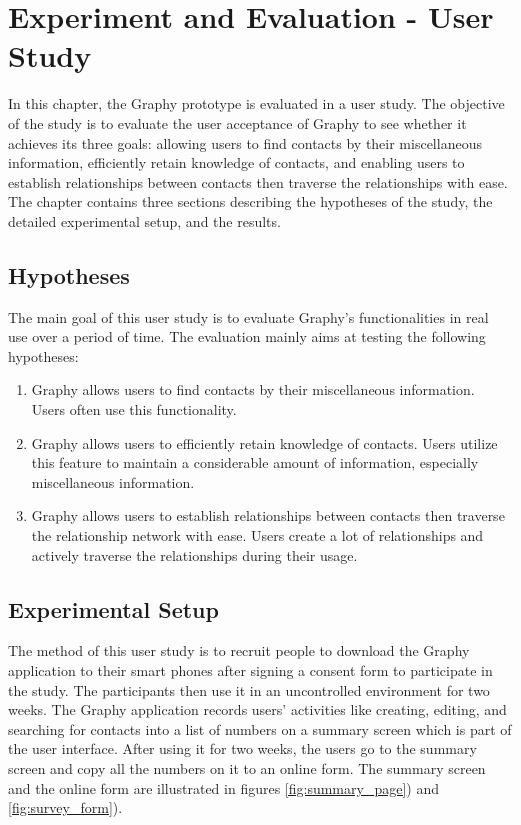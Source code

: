 \chapter{Experiment and Evaluation - User Study}
In this chapter, the Graphy prototype is evaluated in a user study. The objective of the study is to evaluate the user acceptance of Graphy to see whether it achieves its three goals: allowing users to find contacts by their miscellaneous information, efficiently retain knowledge of contacts, and enabling users to establish relationships between contacts then traverse the relationships with ease. The chapter contains three sections describing the hypotheses of the study, the detailed experimental setup, and the results.
\section{Hypotheses}
The main goal of this user study is to evaluate Graphy's functionalities in real use over a period of time. The evaluation mainly aims at testing the following hypotheses:
\begin{enumerate}
  \item Graphy allows users to find contacts by their miscellaneous information. Users often use this functionality.
  \item Graphy allows users to efficiently retain knowledge of contacts. Users utilize this feature to maintain a considerable amount of information, especially miscellaneous information.
  \item Graphy allows users to establish relationships between contacts then traverse the relationship network with ease. Users create a lot of relationships and actively traverse the relationships during their usage.
\end{enumerate}
\section{Experimental Setup}
The method of this user study is to recruit people to download the Graphy application to their smart phones after signing a consent form to participate in the study. The participants then use it in an uncontrolled environment for two weeks. The Graphy application records users' activities like creating, editing, and searching for contacts into a list of numbers on a summary screen which is part of the user interface. After using it for two weeks, the users go to the summary screen and copy all the numbers on it to an online form. The summary screen and the online form are illustrated in figures \ref{fig:summary_page}) and \ref{fig:survey_form}).

